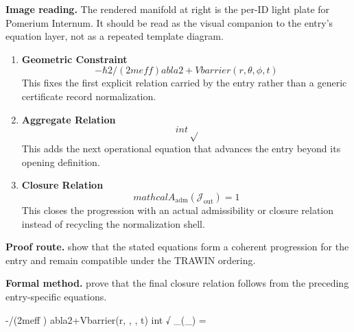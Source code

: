 \begin{samepage}
\noindent\begin{minipage}[t]{0.45\linewidth}
\vspace{0pt}
\raggedright
\scriptsize\textbf{Image reading.} The rendered manifold at right is the per-ID light plate for Pomerium Internum. It should be read as the visual companion to the entry's equation layer, not as a repeated template diagram.\par
\end{minipage}\hfill
\begin{minipage}[t]{0.53\linewidth}
\vspace*{-0.10in}
\raggedright
{}
\end{minipage}
\end{samepage}

\clearpage


\begin{enumerate}[leftmargin=1.6em,itemsep=9pt,topsep=6pt]
\item \textbf{Geometric Constraint}
\[
-\hbar2/(2meff ) abla2+Vbarrier(r, \theta, \phi, t)
\]
This fixes the first explicit relation carried by the entry rather than a generic certificate record normalization.

\item \textbf{Aggregate Relation}
\[
int √
\]
This adds the next operational equation that advances the entry beyond its opening definition.

\item \textbf{Closure Relation}
\[
mathcal{A}_{\mathrm{adm}}\!\left(\mathcal{J}_{\mathrm{out}}\right)=1
\]
This closes the progression with an actual admissibility or closure relation instead of recycling the normalization shell.
\end{enumerate}

\textbf{Proof route.} show that the stated equations form a coherent progression for the entry and remain compatible under the TRAWIN ordering.

\textbf{Formal method.} prove that the final closure relation follows from the preceding entry-specific equations.

\medskip
{}

\begin{tzpsnapshot}
\end{tzpsnapshot}

\tzpequationlinks
  {-/(2meff ) abla2+Vbarrier(r, \theta, \phi, t)}
  {int √}
  {_{}\!\left(_{}\right) = \cdots}
